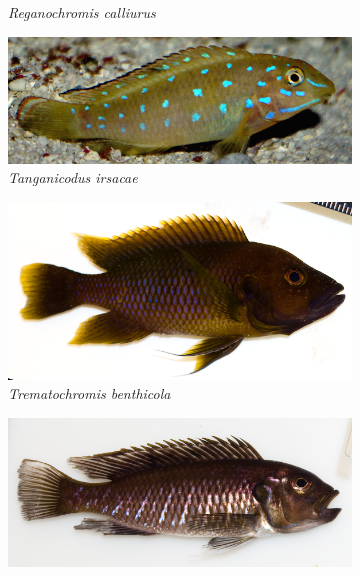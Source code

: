 \begin{figure}
\begin{subfigure}[t]{\fishfigwidth}
        \small
        \caption{\textit{Reganochromis calliurus}}
    \end{subfigure}
    \begin{subfigure}[t]{\fishfigwidth}
        \includegraphics[width=\fishfigwidth]{FishPoo/figures/host_phenotypes/Tanganicodus_irsacae}
        \small
        \caption{\textit{Tanganicodus irsacae}}
    \end{subfigure}
    \begin{subfigure}[t]{\fishfigwidth}
        \includegraphics[width=\fishfigwidth]{FishPoo/figures/host_phenotypes/Trematochromis_benthicola_large}
        \small
        \caption{\textit{Trematochromis benthicola}}
    \end{subfigure}
    \begin{subfigure}[t]{\fishfigwidth}
        \includegraphics[width=\fishfigwidth]{FishPoo/figures/host_phenotypes/Triglachromis_otostigma}

\end{subfigure}
\end{figure}
